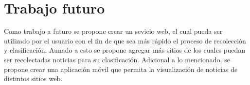 \section[T. Futuro]{Trabajo futuro}

Como trabajo a futuro se propone crear un sevicio web, el cual pueda ser utilizado por el usuario con el fin de que sea más rápido el proceso de recolección y clasificación. Aunado a esto se propone agregar más sitios de los cuales puedan ser recolectadas noticias para su clasificación. Adicional a lo mencionado, se propone crear una aplicación móvil que permita la visualización de noticias de distintos sitios web.
